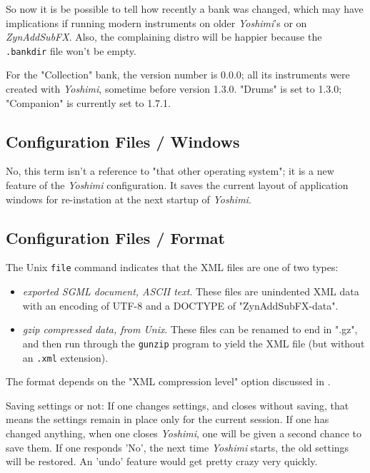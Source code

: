    So now it is be possible to tell how recently a bank was changed, which may
   have implications if running modern instruments on older \textsl{Yoshimi}'s or
   on \textsl{ZynAddSubFX}. Also, the complaining distro will be happier because
   the \texttt{.bankdir} file won't be empty.

   For the "Collection" bank, the version number is 0.0.0; all its instruments
   were created with \textsl{Yoshimi}, sometime before version 1.3.0.  "Drums" is
   set to 1.3.0; "Companion" is currently set to 1.7.1.

\subsection{Configuration Files / Windows}
\label{subsec:configuration_windows}

   No, this term isn't a reference to "that other operating system";
   it is a new feature of the \textsl{Yoshimi} configuration.
   It saves the current layout of application
   windows for re-instation at the next startup
   of \textsl{Yoshimi}.

\subsection{Configuration Files / Format}
\label{subsec:configuration_file_format}

   The Unix \texttt{file} command indicates that the XML files are one of
   two types:

   \begin{itemize}
      \item \textsl{exported SGML document, ASCII text}.
         These files are unindented XML data with an encoding of UTF-8 and
         a DOCTYPE of "ZynAddSubFX-data".
      \item \textsl{gzip compressed data, from Unix}.
         These files can be renamed to end in ".gz", and then run through
         the \texttt{gunzip} program to yield the XML file (but without an
         \texttt{.xml} extension).
   \end{itemize}

   The format depends on the "XML compression level" option discussed in
   .

   Saving settings or not:
   If one changes settings, and closes without saving, that means the settings
   remain in place only for the current session. If one has changed anything,
   when one closes \textsl{Yoshimi}, one will be given a second chance to
   save them. If one responds 'No',  the next time \textsl{Yoshimi} starts,
   the old settings will be restored.  An 'undo' feature would get pretty
   crazy very quickly.

